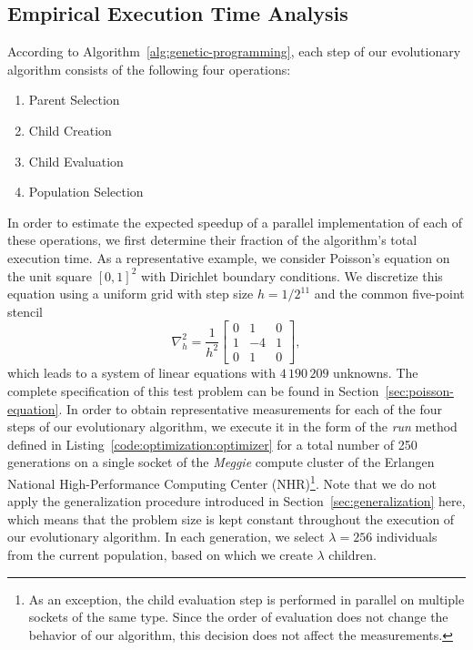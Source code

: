 \subsection{Empirical Execution Time Analysis}
\label{sec:execution-time-analysis}
According to Algorithm~\ref{alg:genetic-programming}, each step of our evolutionary algorithm consists of the following four operations:
\begin{enumerate}
	\item Parent Selection
	\item Child Creation
	\item Child Evaluation
	\item Population Selection
\end{enumerate}
In order to estimate the expected speedup of a parallel implementation of each of these operations, we first determine their fraction of the algorithm's total execution time.
As a representative example, we consider Poisson's equation on the unit square $\left[0,1\right]^2$ with Dirichlet boundary conditions. 
We discretize this equation using a uniform grid with step size $h = 1/2^{11}$ and the common five-point stencil
\begin{equation*}
	\nabla^2_h = 
	\frac{1}{h^2} \begin{bmatrix}
		0 & 1 & 0\\
		1 & -4 & 1 \\
		0 & 1 & 0  
	\end{bmatrix},
\end{equation*} 
which leads to a system of linear equations with $4\,190\,209$ unknowns.
The complete specification of this test problem can be found in Section~\ref{sec:poisson-equation}.
In order to obtain representative measurements for each of the four steps of our evolutionary algorithm, we execute it in the form of the \emph{run} method defined in Listing~\ref{code:optimization:optimizer} for a total number of 250 generations on a single socket of the \emph{Meggie} compute cluster of the Erlangen National High-Performance Computing Center (NHR)\footnote{As an exception, the child evaluation step is performed in parallel on multiple sockets of the same type. Since the order of evaluation does not change the behavior of our algorithm, this decision does not affect the measurements.}.
Note that we do not apply the generalization procedure introduced in Section~\ref{sec:generalization} here, which means that the problem size is kept constant throughout the execution of our evolutionary algorithm.
In each generation, we select $\lambda = 256$ individuals from the current population, based on which we create $\lambda$ children.
